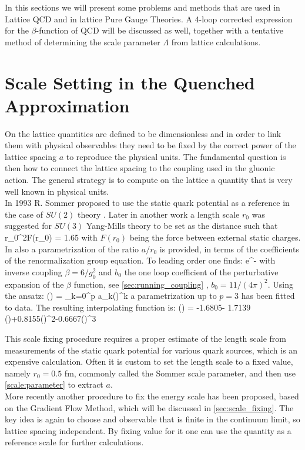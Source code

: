 In this sections we will present some problems and methods that are used in Lattice QCD and in lattice Pure Gauge Theories. A 4-loop corrected expression for the $\beta$-function of QCD will be discussed as well, together with a tentative method of determining the scale parameter $\Lambda$ from lattice calculations.

\section{Scale Setting in the Quenched Approximation}
On the lattice quantities are defined to be dimensionless and in order to link them with physical observables they need to be fixed by the correct power of the lattice spacing $a$ to reproduce the physical units. The fundamental question is then how to connect the lattice spacing to the coupling used in the gluonic action. The general strategy is to compute on the lattice a quantity that is very well known in physical units.\\ 
In 1993 R. Sommer proposed to use the static quark potential as a reference in the case of $SU(2)$ theory \cite{sommer_new_1994}. Later in another work \cite{guagnelli_precision_1998} a length scale $r_0$ was suggested for $SU(3)$ Yang-Mills theory to be set as the distance such that 
\beq
r_0^2F(r_0) = 1.65
\eeq 
with $F(r_0)$ being the force between external static charges. In \cite{guagnelli_precision_1998} also a parametrization of the ratio $a/r_0$ is provided, in terms of the coefficients of the renormalization group equation. To leading order one finds:
\beq
     \propto e^{-}
\eeq
with inverse coupling $\beta = 6/g_0^2$ and $b_0$ the one loop coefficient of the perturbative expansion of the $\beta$ function, see \cref{sec:running_coupling}
, $b_0=11/(4\pi)^2$. Using the ansatz:
\beq
    \ln\left(\right) = \sum_{k=0}^p a_k()^k
\eeq
a parametrization up to $p=3$ has been fitted to data. The resulting interpolating function is:
\beq
    \ln\left(\right) = -1.6805- 1.7139 ()+0.8155()^2-0.6667()^3
    \label{scale:parameter}
\eeq

 
This scale fixing procedure requires a proper estimate of the length scale from measurements of the static quark potential for various quark sources, which is an expensive calculation. Often it is custom to set the length scale to a fixed value, namely $r_0 = 0.5$ fm, commonly called the Sommer scale parameter, and then use \cref{scale:parameter} to extract $a$. \\
More recently another procedure to fix the energy scale has been proposed, based on the Gradient Flow Method, which will be discussed in \cref{sec:scale_fixing}. The key idea is again to choose and observable that is finite in the continuum limit, so lattice spacing independent. By fixing value for it one can use the quantity as a reference scale for further calculations.  

